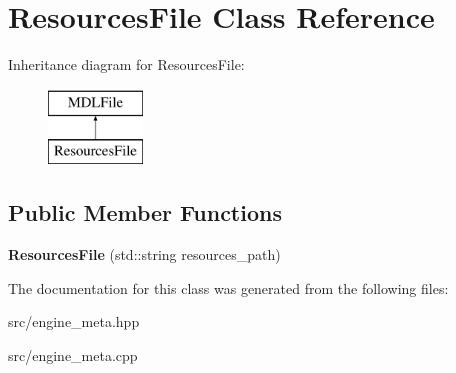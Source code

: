 \hypertarget{class_resources_file}{}\section{Resources\+File Class Reference}
\label{class_resources_file}
Inheritance diagram for Resources\+File\+:\begin{figure}[H]
\begin{center}
\leavevmode
\includegraphics[height=2.000000cm]{class_resources_file}
\end{center}
\end{figure}
\subsection*{Public Member Functions}
\begin{DoxyCompactItemize}
\item 
\mbox{\label{class_resources_file_af54641444509becb743c53c807229ccb}} 
{\bfseries Resources\+File} (std\+::string resources\+\_\+path)
\end{DoxyCompactItemize}


The documentation for this class was generated from the following files\+:\begin{DoxyCompactItemize}
\item 
src/engine\+\_\+meta.\+hpp\item 
src/engine\+\_\+meta.\+cpp\end{DoxyCompactItemize}
